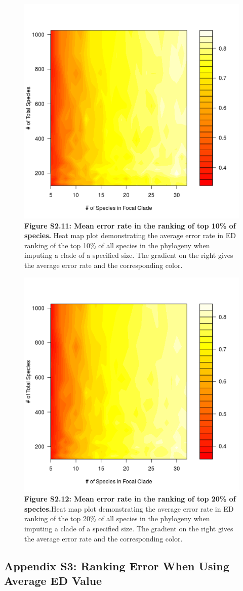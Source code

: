 \documentclass[10pt,english]{article}
\begin{document}
\begin{figure}[!ht]
  \center
  \includegraphics[width=.5\textwidth]{../figures/errorRate10pct.png}
  \caption*{\textbf{Figure S2.11: Mean error rate in the ranking of top 10\% of
  species.} Heat map plot demonstrating the average error rate in ED ranking of
  the top 10\% of all species in the phylogeny when imputing a clade of a
  specified size. The gradient on the right gives the average error rate and the
  corresponding color.}
\end{figure}

\begin{figure}[!ht]
  \center
  \includegraphics[width=.5\textwidth]{../figures/errorRate20pct.png}
  \caption*{\textbf{Figure S2.12: Mean error rate in the ranking of top 20\% of
  species.}Heat map plot demonstrating the average error rate in ED ranking of
  the top 20\% of all species in the phylogeny when imputing a clade of a
  specified size. The gradient on the right gives the average error rate and the
  corresponding color.}
\end{figure}
\clearpage
\subsection*{Appendix S3: Ranking Error When Using Average ED Value}
\end{document}
